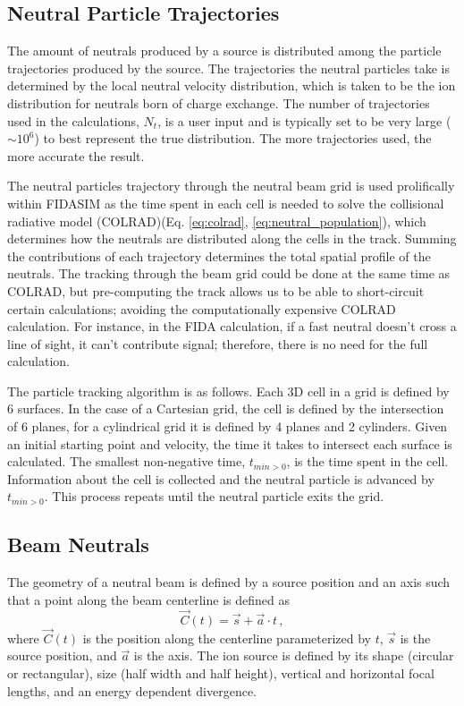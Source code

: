 \subsection{Neutral Particle Trajectories}
The amount of neutrals produced by a source is distributed among the particle trajectories produced by the source. The trajectories the neutral particles take is determined by the local neutral velocity distribution, which is taken to be the ion distribution for neutrals born of charge exchange. The number of trajectories used in the calculations, $N_t$, is a user input and is typically set to be very large ($\sim10^6$) to best represent the true distribution. The more trajectories used, the more accurate the result.

The neutral particles trajectory through the neutral beam grid is used prolifically within FIDASIM as the time spent in each cell is needed to solve the collisional radiative model (COLRAD)(Eq. \ref{eq:colrad}, \ref{eq:neutral_population}), which determines how the neutrals are distributed along the cells in the track. Summing the contributions of each trajectory determines the total spatial profile of the neutrals. The tracking through the beam grid could be done at the same time as COLRAD, but pre-computing the track allows us to be able to short-circuit certain calculations; avoiding the computationally expensive COLRAD calculation. For instance, in the FIDA calculation, if a fast neutral doesn't cross a line of sight, it can't contribute signal; therefore, there is no need for the full calculation.

The particle tracking algorithm is as follows.
Each 3D cell in a grid is defined by 6 surfaces. In the case of a Cartesian grid, the cell is defined by the intersection of 6 planes, for a cylindrical grid it is defined by 4 planes and 2 cylinders. Given an initial starting point and velocity, the time it takes to intersect each surface is calculated. The smallest non-negative time, $t_{min>0}$, is the time spent in the cell. Information about the cell is collected and the neutral particle is advanced by $t_{min>0}$. This process repeats until the neutral particle exits the grid.

\subsection{Beam Neutrals}
The geometry of a neutral beam is defined by a source position and an axis such that a point along the beam centerline is defined as
\begin{equation}\label{eq:nbi_geom}
    \vec{C}(t) = \vec{s} + \vec{a} \cdot t\,,
\end{equation}
where $\vec{C}(t)$ is the position along the centerline parameterized by $t$, $\vec{s}$ is the source position, and $\vec{a}$ is the axis. The ion source is defined by its shape (circular or rectangular), size (half width and half height), vertical and horizontal focal lengths, and an energy dependent divergence. 

